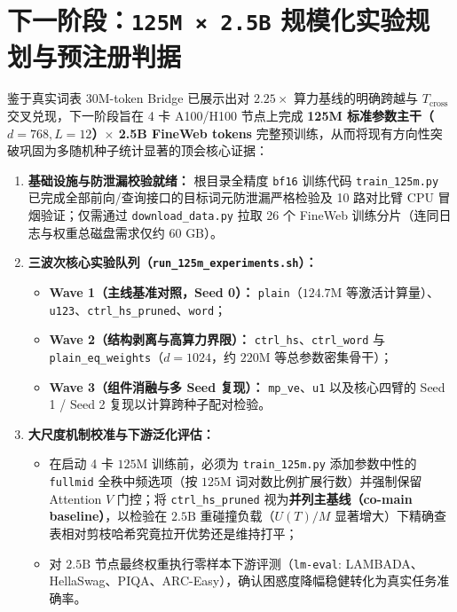 \documentclass[10.5pt,a4paper]{ctexart}
\begin{document}
\section{下一阶段：\texorpdfstring{\texttt{125M × 2.5B}}{125M x 2.5B} 规模化实验规划与预注册判据}

鉴于真实词表 $30\text{M}$-token Bridge 已展示出对 $2.25\times$ 算力基线的明确跨越与 $T_{\text{cross}}$ 交叉兑现，下一阶段旨在 4 卡 A100/H100 节点上完成 \textbf{125M 标准参数主干（$d=768, L=12$）$\times$ 2.5B FineWeb tokens} 完整预训练，从而将现有方向性突破巩固为多随机种子统计显著的顶会核心证据：

\begin{enumerate}
    \item \textbf{基础设施与防泄漏校验就绪：} 根目录全精度 \texttt{bf16} 训练代码 \texttt{train\_125m.py} 已完成全部前向/查询接口的目标词元防泄漏严格检验及 10 路对比臂 CPU 冒烟验证；仅需通过 \texttt{download\_data.py} 拉取 26 个 FineWeb 训练分片（连同日志与权重总磁盘需求仅约 $60\text{ GB}$）。
    \item \textbf{三波次核心实验队列（\texttt{run\_125m\_experiments.sh}）：}
    \begin{itemize}
        \item \textbf{Wave 1（主线基准对照，Seed 0）：} \texttt{plain}（$124.7\text{M}$ 等激活计算量）、\texttt{u123}、\texttt{ctrl\_hs\_pruned}、\texttt{word}；
        \item \textbf{Wave 2（结构剥离与高算力界限）：} \texttt{ctrl\_hs}、\texttt{ctrl\_word} 与 \texttt{plain\_eq\_weights}（$d=1024$，约 $220\text{M}$ 等总参数密集骨干）；
        \item \textbf{Wave 3（组件消融与多 Seed 复现）：} \texttt{mp\_ve}、\texttt{u1} 以及核心四臂的 Seed 1 / Seed 2 复现以计算跨种子配对检验。
    \end{itemize}
    \item \textbf{大尺度机制校准与下游泛化评估：}
    \begin{itemize}
        \item 在启动 4 卡 $125\text{M}$ 训练前，必须为 \texttt{train\_125m.py} 添加参数中性的 \texttt{fullmid} 全秩中频选项（按 $125\text{M}$ 词对数比例扩展行数）并强制保留 Attention $V$ 门控；将 \texttt{ctrl\_hs\_pruned} 视为\textbf{并列主基线（co-main baseline）}，以检验在 $2.5\text{B}$ 重碰撞负载（$U(T)/M$ 显著增大）下精确查表相对剪枝哈希究竟拉开优势还是维持打平；
        \item 对 $2.5\text{B}$ 节点最终权重执行零样本下游评测（\texttt{lm-eval}: LAMBADA、HellaSwag、PIQA、ARC-Easy），确认困惑度降幅稳健转化为真实任务准确率。
    \end{itemize}
\end{enumerate}
\end{document}
